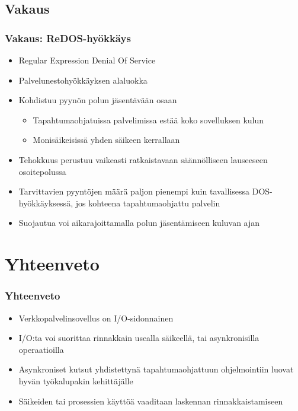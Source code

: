 \documentclass{beamer}
\begin{document}
\subsection{Vakaus}
\begin{frame}
    \frametitle{Vakaus: ReDOS-hyökkäys}
    \begin{itemize}
        \item Regular Expression Denial Of Service
        \item Palvelunestohyökkäyksen alaluokka
        \item Kohdistuu pyynön polun jäsentävään osaan
            \begin{itemize}
                \item Tapahtumaohjatuissa palvelimissa estää koko sovelluksen kulun
                \item Monisäikeisissä yhden säikeen kerrallaan
            \end{itemize}
        \item Tehokkuus perustuu vaikeasti ratkaistavaan säännölliseen lauseeseen
            osoitepolussa
        \item Tarvittavien pyyntöjen määrä paljon pienempi kuin tavallisessa
            DOS-hyökkäyksessä, jos kohteena tapahtumaohjattu palvelin
        \item Suojautua voi aikarajoittamalla polun jäsentämiseen kuluvan 
            ajan
    \end{itemize}
\end{frame}
\section{Yhteenveto}
\begin{frame}
    \frametitle{Yhteenveto}
    \begin{itemize}
        \item Verkkopalvelinsovellus on I/O-sidonnainen
        \item I/O:ta voi suorittaa rinnakkain usealla säikeellä,
            tai asynkronisilla operaatioilla
        \item Asynkroniset kutsut yhdistettynä tapahtumaohjattuun
            ohjelmointiin luovat hyvän työkalupakin kehittäjälle
        \item Säikeiden tai prosessien käyttöä vaaditaan
            laskennan rinnakkaistamiseen
    \end{itemize}
\end{frame}
\end{document}
